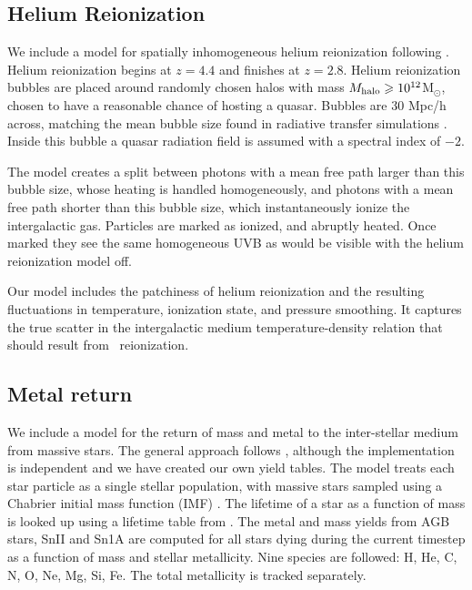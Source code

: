 \documentclass[fleqn,usenatbib]{mnras}
\newcommand{\HeII}{\ion{He}{II}}
\begin{document}
\subsection{Helium Reionization}

We include a model for spatially inhomogeneous helium reionization following \cite{2020MNRAS.496.4372U}. Helium reionization begins at $z=4.4$ and finishes at $z=2.8$.
Helium reionization bubbles are placed around randomly chosen halos with mass $M_{\rm halo}\geq10^{12}$M$_{\odot}$, chosen to have a reasonable chance of hosting a quasar. Bubbles are $30$ Mpc/h across, matching the mean bubble size found in radiative transfer simulations \citep{2009ApJ...694..842M}. Inside this bubble a quasar radiation field is assumed with a spectral index of $-2$.

The model creates a split between photons with a mean free path larger than this bubble size, whose heating is handled homogeneously, and photons with a mean free path shorter than this bubble size, which instantaneously ionize the intergalactic gas. Particles are marked as ionized, and abruptly heated. Once marked they see the same homogeneous UVB as would be visible with the helium reionization model off.

Our model includes the patchiness of helium reionization and the resulting fluctuations in temperature, ionization state, and pressure smoothing. It captures the true scatter in the intergalactic medium temperature-density relation that should result from \HeII\ reionization.

\subsection{Metal return}

We include a model for the return of mass and metal to the inter-stellar medium from massive stars. The general approach follows \cite{Vogelsberger:2013, Pillepich:2018}, although the implementation is independent and we have created our own yield tables. The model treats each star particle as a single stellar population, with massive stars sampled using a Chabrier initial mass function (IMF) \cite{Chabrier:2003}. The lifetime of a star as a function of mass is looked up using a lifetime table from \cite{Portinari:1998}. The metal and mass yields from AGB stars, SnII and Sn1A are computed for all stars dying during the current timestep as a function of mass and stellar metallicity. Nine species are followed: H, He, C, N, O, Ne, Mg, Si, Fe. The total metallicity is tracked separately.
\end{document}
